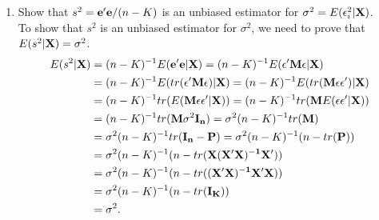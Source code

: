 \documentclass[12pt,a4paper]{article}
\begin{document}
\begin{enumerate}
\begin{enumerate}
We know that SSR$({\bf b})={\bf e'e}$. By using the identity in the above Question 2(b) such that ${\bf e}={\bf M\epsilon}$.
\begin{align*}
SSR({\bf b})=({\bf M\epsilon})'{\bf M\epsilon}=\epsilon'{\bf M'M\epsilon}.
\end{align*}
Note that ${\bf M}$ is a symmetric matrix, since ${\bf M'}=({\bf I_{n}-P})'={\bf I_{n}'}-{\bf P'}={\bf I_{n}'}-({\bf X(X'X)^{-1}X'})'={\bf I_{n}}-{\bf X(X'X)^{-1}X'}={\bf M}$. Also, ${\bf M}$ is an idempotent matrix since
\begin{align*}
{\bf M M}&=({\bf I_{n}-P})({\bf I_{n}-P})={\bf I_{n}}-2{\bf P}+{\bf P P}
&={\bf I_{n}}-2{\bf P}+{\bf P}={\bf I_{n}}-{\bf P},
\end{align*}
where ${\bf P P}={\bf X(X'X)^{-1}X'X(X'X)^{-1}X'}={\bf X(X'X)^{-1}X'}={\bf P}$.
By using ${\bf M}$ being a symmetric and idempotent matrix, we can write that
\begin{align*}
SSR({\bf b})=\epsilon'{\bf M'M\epsilon}=\epsilon'{\bf M M\epsilon}=\epsilon'{\bf M\epsilon}.
\end{align*}
\item{Show that $s^{2}={\bf e'e}/(n-K)$ is an unbiased estimator for $\sigma^{2}=E(\epsilon_{i}^{2}|{\bf X})$.}\\

To show that $s^{2}$ is an unbiased estimator for $\sigma^{2}$, we need to prove that $E(s^{2}|{\bf X})=\sigma^{2}$.
\begin{align*}
E(s^{2}|{\bf X})&=(n-K)^{-1} E({\bf e'e|X})=(n-K)^{-1} E({\bf \epsilon' M \epsilon|X})\\
&=(n-K)^{-1} E(tr({\bf \epsilon' M \epsilon)|X})=(n-K)^{-1} E(tr({\bf  M \epsilon\epsilon')|X})\\
&=(n-K)^{-1} tr(E({\bf  M \epsilon\epsilon'|X}))=(n-K)^{-1} tr({\bf M}E({\bf   \epsilon\epsilon'|X}))\\
&=(n-K)^{-1}tr({\bf M}\sigma^{2}{\bf I_{n}})=\sigma^{2}(n-K)^{-1}tr({\bf M})\\
&=\sigma^{2}(n-K)^{-1}tr({\bf I_{n}-P})=\sigma^{2}(n-K)^{-1}(n-tr({\bf P}))\\
&=\sigma^{2}(n-K)^{-1}(n-tr({\bf X(X'X)^{-1}X' }))\\
&=\sigma^{2}(n-K)^{-1}(n-tr({\bf (X'X)^{-1}X'X }))\\
&=\sigma^{2}(n-K)^{-1}(n-tr({\bf I_{K} }))\\
&=\sigma^{2}.
\end{align*}
\end{enumerate}
\vspace*{0.5cm}
\end{enumerate}
\end{document}
